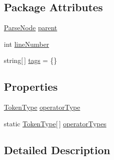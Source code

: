\subsection*{Package Attributes}
\begin{DoxyCompactItemize}
\item 
\hyperlink{a00122}{Parse\-Node} \hyperlink{a00122_af313a82103fcc2ff5a177dbb06b92f7b}{parent}
\item 
int \hyperlink{a00122_a18b493382de0fde5b4299c1bd2250075}{line\-Number}
\item 
string\mbox{[}$\,$\mbox{]} \hyperlink{a00122_a58b3a15788fd2d4127d73619dc6d04ae}{tags} = \{\}
\end{DoxyCompactItemize}
\subsection*{Properties}
\begin{DoxyCompactItemize}
\item 
\hyperlink{a00031_a301aa7c866593a5b625a8fc158bbeace}{Token\-Type} \hyperlink{a00117_ac2de2f59be0e69b316627a4de16fadd3}{operator\-Type}
\item 
static \hyperlink{a00031_a301aa7c866593a5b625a8fc158bbeace}{Token\-Type}\mbox{[}$\,$\mbox{]} \hyperlink{a00117_a8dca7db3b76b8c358aba6068274e07df}{operator\-Types}
\end{DoxyCompactItemize}


\subsection{Detailed Description}


